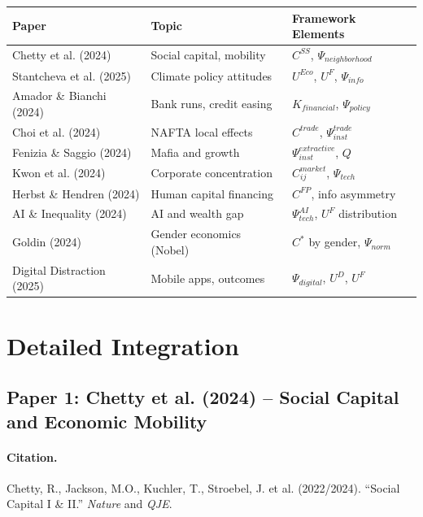 \begin{center}
\renewcommand{\arraystretch}{1.15}
\small
\begin{tabular}{lll}
\hline
\textbf{Paper} & \textbf{Topic} & \textbf{Framework Elements} \\
\hline
Chetty et al. (2024) & Social capital, mobility & $C^{SS}$, $\Psi_{neighborhood}$ \\
Stantcheva et al. (2025) & Climate policy attitudes & $U^{Eco}$, $U^F$, $\Psi_{info}$ \\
Amador \& Bianchi (2024) & Bank runs, credit easing & $K_{financial}$, $\Psi_{policy}$ \\
Choi et al. (2024) & NAFTA local effects & $C^{trade}$, $\Psi_{inst}^{trade}$ \\
Fenizia \& Saggio (2024) & Mafia and growth & $\Psi_{inst}^{extractive}$, $Q$ \\
Kwon et al. (2024) & Corporate concentration & $C_{ij}^{market}$, $\Psi_{tech}$ \\
Herbst \& Hendren (2024) & Human capital financing & $C^{FP}$, info asymmetry \\
AI \& Inequality (2024) & AI and wealth gap & $\Psi_{tech}^{AI}$, $U^F$ distribution \\
Goldin (2024) & Gender economics (Nobel) & $C^*$ by gender, $\Psi_{norm}$ \\
Digital Distraction (2025) & Mobile apps, outcomes & $\Psi_{digital}$, $U^D$, $U^F$ \\
\hline
\end{tabular}
\end{center}


\section{Detailed Integration}
\label{sec:J-detailed}

\subsection{Paper 1: Chetty et al. (2024) -- Social Capital and Economic Mobility}

\paragraph{Citation.}
Chetty, R., Jackson, M.O., Kuchler, T., Stroebel, J. et al. (2022/2024).
``Social Capital I \& II.'' \emph{Nature} and \emph{QJE}.

